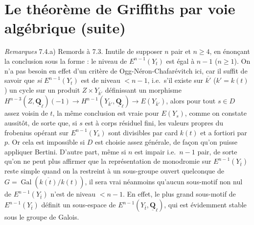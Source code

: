\documentclass[11pt,a4paper]{article}
\begin{document}
\section*{Le théorème de Griffiths par voie algébrique (suite)}




\emph{Remarques} 7.4.\quad a) Remords à 7.3. Inutile de supposer $n$ pair et
$n \geqslant 4$, en énonçant la conclusion sous la forme : le niveau de
$E^{n-1}(Y_t)$ est égal à $n-1$ ($n \geqslant 1$). On n'a pas besoin en effet
d'un critère de Ogg-Néron-Chafarévitch ici, car il suffit de savoir que
\emph{si} $E^{n-1}(Y_t)$ est de niveau $< n-1$, i.e.\ s'il existe sur
$\overline{k'}$ ($k' = k(t)$) un cycle sur un produit $Z \times
Y_{\overline{k'}}$ définissant un morphisme $H^{n-3}(Z,
\underline{\mathbf{Q}}_\ell)(-1) \to H^{n-1}(Y_{\bar{k}'},
\underline{\mathbf{Q}}_\ell) \to E(Y_{\bar{k}'})$, alors pour tout $s \in D$
assez voisin de $t$, la même conclusion est vraie pour $E(Y_s)$, comme on
constate aussitôt, de sorte que, si $s$ est à corps résiduel fini, les valeurs
propres du frobenius opérant sur $E^{n-1}(Y_{\bar{s}})$ sont divisibles par card
$k(t)$ et a fortiori par $p$. Or cela est impossible si $D$ est choisie assez
générale, de façon qu'on puisse appliquer Bertini. D'autre part, même si $n$
est impair i.e.\ $n-1$ pair, de sorte qu'on ne peut plus affirmer que la
représentation de monodromie sur $E^{n-1}(Y_{\bar t})$ reste simple quand on la
restreint à un sous-groupe ouvert quelconque de $G =
\operatorname{Gal}(\overline{k(t)}/k(t))$, il sera vrai néanmoins qu'aucun
sous-motif non nul de $E^{n-1}(Y_{\bar t})$ n'est de niveau $< n-1$. En effet,
le plus grand sous-motif  de $E^{n-1}(Y_{\bar t})$
définit un sous-espace de $E^{n-1}(Y_{\bar t}, \underline{\mathbf{Q}}_\ell)$,
qui est évidemment stable sous le groupe de Galois.
\end{document}
